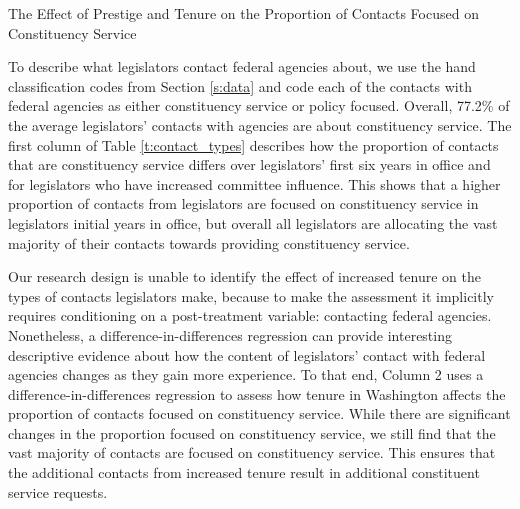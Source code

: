 \documentclass[12pt]{article}
\begin{document}
\begin{table}
\begin{center}
\begin{minipage}{\textwidth}
\caption{The Effect of Prestige and Tenure on the Proportion of Contacts Focused on Constituency Service} \label{t:contact_types}
\centering

\end{minipage}
\end{center}
\end{table}

To describe what legislators contact federal agencies about, we use the hand classification codes from Section \ref{s:data} and code each of the contacts with federal agencies as either constituency service or policy focused. Overall, 77.2\% of the average legislators' contacts with agencies are about constituency service. The first column of Table \ref{t:contact_types} describes how the proportion of contacts that are constituency service differs over legislators' first six years in office and for legislators who have increased committee influence. This shows that a higher proportion of contacts from legislators are focused on constituency service in legislators initial years in office, but overall all legislators are allocating the vast majority of their contacts towards providing constituency service. 

Our research design is unable to identify the effect of increased tenure on the types of contacts legislators make, because to make the assessment it implicitly requires conditioning on a post-treatment variable: contacting federal agencies. Nonetheless, a difference-in-differences regression can provide interesting descriptive evidence about how the content of legislators' contact with federal agencies changes as they gain more experience. To that end, Column 2 uses a difference-in-differences regression to assess how tenure in Washington affects the proportion of contacts focused on constituency service. While there are significant changes in the proportion focused on constituency service, we still find that the vast majority of contacts are focused on constituency service. This ensures that the additional contacts from increased tenure result in additional constituent service requests. 
\end{document}

